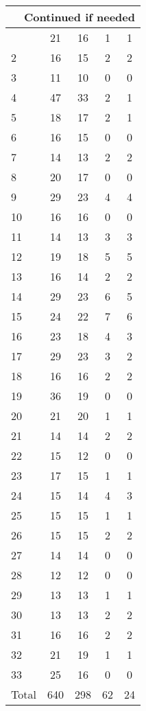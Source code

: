 \begin{center}
\begin{longtable}{l|c|c|c|c}
\hline \multicolumn{5}{|r|}{{Continued if needed}} \\ \hline
\endfoot 
1 & 21 & 16 & 1 & 1\\ \hline
2 & 16 & 15 & 2 & 2\\ \hline
3 & 11 & 10 & 0 & 0\\ \hline
4 & 47 & 33 & 2 & 1\\ \hline
5 & 18 & 17 & 2 & 1\\ \hline
6 & 16 & 15 & 0 & 0\\ \hline
7 & 14 & 13 & 2 & 2\\ \hline
8 & 20 & 17 & 0 & 0\\ \hline
9 & 29 & 23 & 4 & 4\\ \hline
10 & 16 & 16 & 0 & 0\\ \hline
11 & 14 & 13 & 3 & 3\\ \hline
12 & 19 & 18 & 5 & 5\\ \hline
13 & 16 & 14 & 2 & 2\\ \hline
14 & 29 & 23 & 6 & 5\\ \hline
15 & 24 & 22 & 7 & 6\\ \hline
16 & 23 & 18 & 4 & 3\\ \hline
17 & 29 & 23 & 3 & 2\\ \hline
18 & 16 & 16 & 2 & 2\\ \hline
19 & 36 & 19 & 0 & 0\\ \hline
20 & 21 & 20 & 1 & 1\\ \hline
21 & 14 & 14 & 2 & 2\\ \hline
22 & 15 & 12 & 0 & 0\\ \hline
23 & 17 & 15 & 1 & 1\\ \hline
24 & 15 & 14 & 4 & 3\\ \hline
25 & 15 & 15 & 1 & 1\\ \hline
26 & 15 & 15 & 2 & 2\\ \hline
27 & 14 & 14 & 0 & 0\\ \hline
28 & 12 & 12 & 0 & 0\\ \hline
29 & 13 & 13 & 1 & 1\\ \hline
30 & 13 & 13 & 2 & 2\\ \hline
31 & 16 & 16 & 2 & 2\\ \hline
32 & 21 & 19 & 1 & 1\\ \hline
33 & 25 & 16 & 0 & 0\\ \hline
\hline \hline
Total & 640 & 298 & 62 & 24




\end{longtable}
\end{center}

